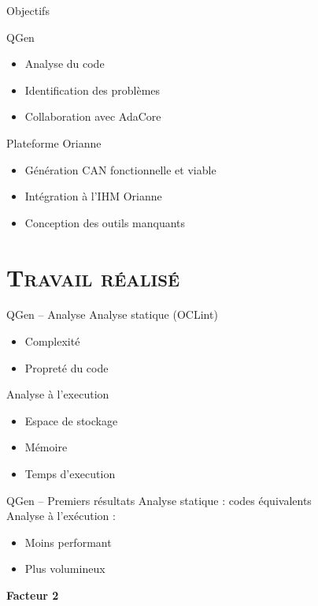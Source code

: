 \documentclass[xcolor=x11names,compress]{beamer}
\begin{document}
\begin{frame}{Objectifs}
  \begin{exampleblock}{QGen}{}
	\begin{itemize}
	  \item Analyse du code
	  \item Identification des problèmes
	  \item Collaboration avec AdaCore
	\end{itemize}
  \end{exampleblock}
  \begin{exampleblock}{Plateforme Orianne}{}
	\begin{itemize}
	  \item Génération CAN fonctionnelle et viable
	  \item Intégration à l'IHM Orianne
	  \item Conception des outils manquants
	\end{itemize}
  \end{exampleblock}
\end{frame}

\section{\scshape Travail réalisé}
\begin{frame}{QGen -- Analyse}
  \vfill
  Analyse statique (OCLint)
  \begin{itemize}
	\item Complexité
	\item Propreté du code
  \end{itemize}
  \vfill
  Analyse à l'execution
  \begin{itemize}
	\item Espace de stockage
	\item Mémoire
	\item Temps d'execution
  \end{itemize}
  \vfill
\end{frame}

\begin{frame}{QGen -- Premiers résultats}
  \vfill
  Analyse statique : codes équivalents\\
  \vfill
  Analyse à l'exécution :
  \begin{itemize}
	\item Moins performant
	\item Plus volumineux
  \end{itemize}
  \vfill
  \centering
  {\bf Facteur 2}
  \vfill
\end{frame}
\end{document}
